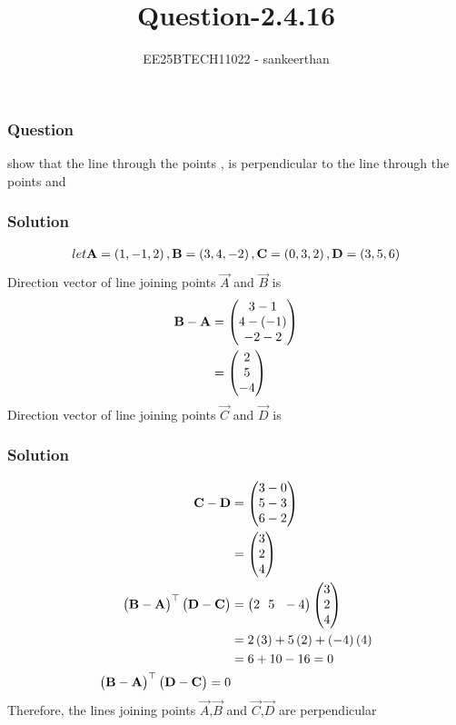 \documentclass{beamer}
\title{Question-2.4.16}
\author{EE25BTECH11022 - sankeerthan}
\date{}
\begin{document}
\frame{\titlepage}

\begin{frame}
\frametitle{Question}
show that the line through the points  ,  is perpendicular to the line through the  points   and 
\end{frame}

\begin{frame}
\frametitle{Solution}\begin{align}
let \Vec{A} =\brak{1,-1,2},\Vec{B} =\brak{3,4,-2},\Vec{C} =\brak{0,3,2},\Vec{D} =\brak{3,5,6}
\end{align}
Direction vector of line joining points $\Vec{A}$ and $\Vec{B}$ is
\begin{align}
    \Vec{B}-\Vec{A} &= \myvec{3-1 \\ 4-(-1) \\ -2-2}\\
    &= \myvec{2 \\ 5 \\-4}\\
\end{align}
Direction vector of line joining points $\Vec{C}$ and $\Vec{D}$ is
\end{frame}

\begin{frame}
\frametitle{Solution}
\begin{align}
    \Vec{C}-\Vec{D} &= \myvec{3-0 \\ 5-3 \\ 6-2}\\
    &= \myvec{3 \\ 2 \\4}\\
\myvec{\vec{B}-\vec{A}}^\top\myvec{\vec{D}-\vec{C}} &= \myvec{2 \ \ 5 \ \ -4}\myvec{3 \\ 2 \\4}\\
 &= 2\brak{3}+5\brak{2}+\brak{-4}\brak{4}\\
 &=6+10-16 =0\\
 \myvec{\vec{B}-\vec{A}}^\top\myvec{\vec{D}-\vec{C}} = 0
\end{align}
Therefore, the lines joining points $\Vec{A}$,$\Vec{B}$ and $\Vec{C}$,$\Vec{D}$ are perpendicular 

\end{frame}
\end{document}
